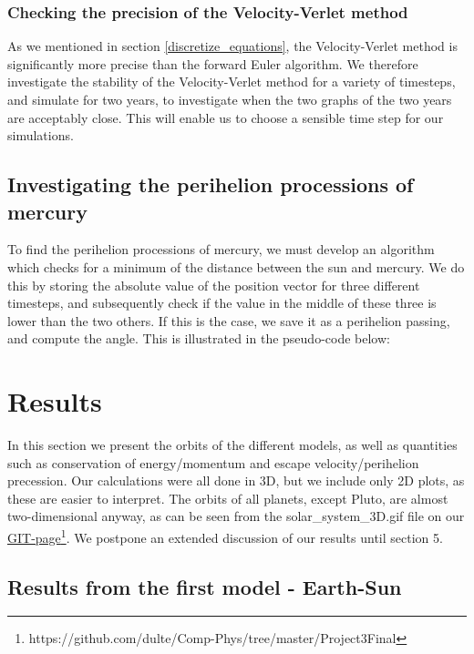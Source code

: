 \documentclass[a4paper, 10pt]{article}
\begin{document}
\subsubsection{Checking the precision of the Velocity-Verlet method}
As we mentioned in section \ref{discretize_equations}, the Velocity-Verlet method is significantly more precise than the forward Euler algorithm. We therefore investigate the stability of the Velocity-Verlet method for a variety of timesteps, and simulate for two years, to investigate when the two graphs of the two years are acceptably close. This will enable us to choose a sensible time step for our simulations.
\subsection{Investigating the perihelion processions of mercury}
To find the perihelion processions of mercury, we must develop an algorithm which checks for a minimum of the distance between the sun and mercury. We do this by storing the absolute value of the position vector for three different timesteps, and subsequently check if the value in the middle of these three is lower than the two others. If this is the case, we save it as a perihelion passing, and compute the angle. This is illustrated in the pseudo-code below:

\newpage

\section{Results}
In this section we present the orbits of the different models, as well as quantities such as conservation of energy/momentum and escape velocity/perihelion precession. Our calculations were all done in 3D, but we include only 2D plots, as these are easier to interpret. The orbits of all planets, except Pluto, are almost two-dimensional anyway, as can be seen from the solar\_system\_3D.gif file on our \href{https://github.com/dulte/Comp-Phys/tree/master/Project3Final}{GIT-page}\footnote{https://github.com/dulte/Comp-Phys/tree/master/Project3Final}. We postpone an extended discussion of our results until section 5.
\subsection{Results from the first model - Earth-Sun}
\end{document}
